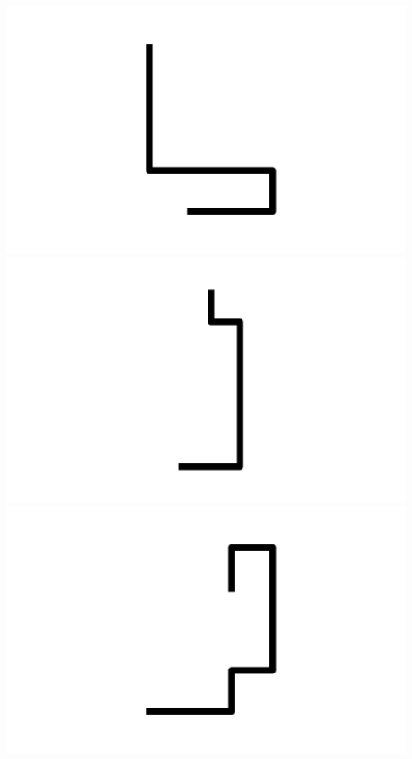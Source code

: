 \documentclass[]{report}
\begin{document}
\includegraphics[scale=.1]{pictures/21/state_cluster_shapes_193.pdf} 
\includegraphics[scale=.1]{pictures/21/state_cluster_shapes_194.pdf} 
\includegraphics[scale=.1]{pictures/21/state_cluster_shapes_195.pdf} 
\end{document}
